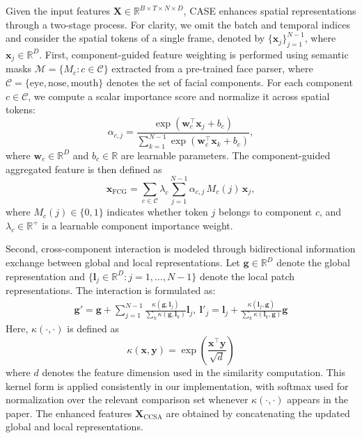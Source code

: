 \documentclass[runningheads]{llncs}
\begin{document}
Given the input features $\mathbf{X} \in \mathbb{R}^{B \times T \times N \times D}$, CASE enhances spatial representations through a two-stage process. 
For clarity, we omit the batch and temporal indices and consider the spatial tokens of a single frame, denoted by $\{\mathbf{x}_j\}_{j=1}^{N-1}$, where $\mathbf{x}_j \in \mathbb{R}^D$. 
First, component-guided feature weighting is performed using semantic masks $\mathcal{M} = \{M_c : c \in \mathcal{C}\}$ extracted from a pre-trained face parser, where $\mathcal{C} = \{\text{eye}, \text{nose}, \text{mouth}\}$ denotes the set of facial components. 
For each component $c \in \mathcal{C}$, we compute a scalar importance score and normalize it across spatial tokens:
\begin{equation}
\alpha_{c,j}=
\frac{\exp(\mathbf{w}_c^\top \mathbf{x}_j + b_c)}
{\sum_{k=1}^{N-1}\exp(\mathbf{w}_c^\top \mathbf{x}_k + b_c)},
\end{equation}
where $\mathbf{w}_c \in \mathbb{R}^{D}$ and $b_c \in \mathbb{R}$ are learnable parameters. 
The component-guided aggregated feature is then defined as
\begin{equation}
\mathbf{x}_{\text{FCG}}=
\sum_{c \in \mathcal{C}} \lambda_c
\sum_{j=1}^{N-1}\alpha_{c,j}\, M_c(j)\,\mathbf{x}_j,
\end{equation}
where $M_c(j)\in\{0,1\}$ indicates whether token $j$ belongs to component $c$, and $\lambda_c \in \mathbb{R}^+$ is a learnable component importance weight.

Second, cross-component interaction is modeled through bidirectional information exchange between global and local representations. Let $\mathbf{g} \in \mathbb{R}^D$ denote the global representation and $\{\mathbf{l}_j \in \mathbb{R}^D : j = 1, \ldots, N-1\}$ denote the local patch representations. The interaction is formulated as:
\begin{equation}
\begin{split}
\mathbf{g}' = \mathbf{g} + \sum_{j=1}^{N-1} \frac{\kappa(\mathbf{g}, \mathbf{l}_j)}{\sum_k \kappa(\mathbf{g}, \mathbf{l}_k)} \mathbf{l}_j ,~ 
\mathbf{l}'_j = \mathbf{l}_j + \frac{\kappa(\mathbf{l}_j, \mathbf{g})}{\sum_k \kappa(\mathbf{l}_k, \mathbf{g})} \mathbf{g}
\end{split}
\end{equation}
Here, $\kappa(\cdot,\cdot)$ is defined as
\begin{equation}
\kappa(\mathbf{x},\mathbf{y})=\exp\!\left(\frac{\mathbf{x}^{\top}\mathbf{y}}{\sqrt{d}}\right)
\end{equation}
where $d$ denotes the feature dimension used in the similarity computation. This kernel form is applied consistently in our implementation, with softmax used for normalization over the relevant comparison set whenever $\kappa(\cdot,\cdot)$ appears in the paper. The enhanced features $\mathbf{X}_{\text{CCSA}}$ are obtained by concatenating the updated global and local representations.
\end{document}
